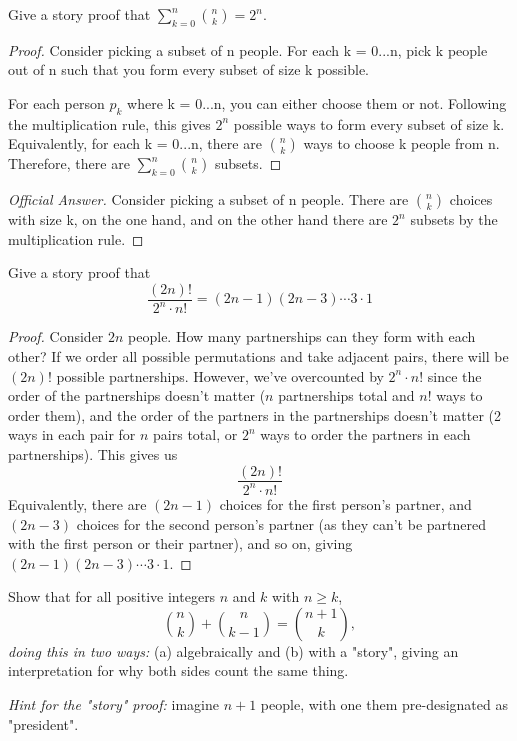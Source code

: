 \documentclass[10pt]{article}
\newenvironment{problem}[2][Problem]{\begin{trivlist}
\item[\hskip \labelsep {\bfseries #1}\hskip \labelsep {\bfseries #2.}]}{\end{trivlist}}
\begin{document}
\begin{problem}{5} 
Give a story proof that $\sum^{n}_{k=0}\binom{n}{k} = 2^n$.
\end{problem}

\begin{proof}[Proof]
Consider picking a subset of n people. For each k = 0...n, pick k people out of n such that you form every subset of size k possible.

For each person $p_k$ where k = 0...n, you can either choose them or not. Following the multiplication rule, this gives $2^n$ possible ways to form every subset of size k. Equivalently, for each k = 0...n, there are \(\binom{n}{k}\) ways to choose k people from n. Therefore, there are  $\sum^{n}_{k=0}\binom{n}{k}$ subsets.

\end{proof}
\begin{proof}[Official Answer]
Consider picking a subset of n people. There are \(\binom{n}{k}\) choices with size k, on the one hand, and on the other hand there are $2^n$ subsets by the multiplication rule.
\end{proof}

\begin{problem}{6} 
Give a story proof that 
\[
\frac{(2n)!}{2^n \cdot n!} = (2n - 1)(2n - 3)\cdots 3 \cdot 1
\]
\end{problem}

\begin{proof}[Proof]

Consider $2n$ people. How many partnerships can they form with each other? If we order all possible permutations and take adjacent pairs, there will be $(2n)!$ possible partnerships. However, we've overcounted by $2^n \cdot n!$ since the order of the partnerships doesn't matter ($n$ partnerships total and $n!$ ways to order them), and the order of the partners in the partnerships doesn't matter (2 ways in each pair for $n$ pairs total, or $2^n$ ways to order the partners in each partnerships). This gives us 
\[
\frac{(2n)!}{2^n \cdot n!}
\]
Equivalently, there are $(2n - 1)$ choices for the first person's partner, and $(2n - 3)$ choices for the second person's partner (as they can't be partnered with the first person or their partner), and so on, giving $(2n - 1)(2n - 3)\cdots 3 \cdot 1$.
 
\end{proof}

\begin{problem}{7} 
Show that for all positive integers $n$ and $k$ with $n \geq k$,
\[
\binom{n}{k} + \binom{n}{k-1} = \binom{n+1}{k},
\]
\textit{doing this in two ways:} (a) algebraically and (b) with a "story", giving an interpretation for why both sides count the same thing. 


\quad \textit{Hint for the "story" proof:} imagine $n+1$ people, with one them pre-designated as "president".
\end{problem}
\end{document}
